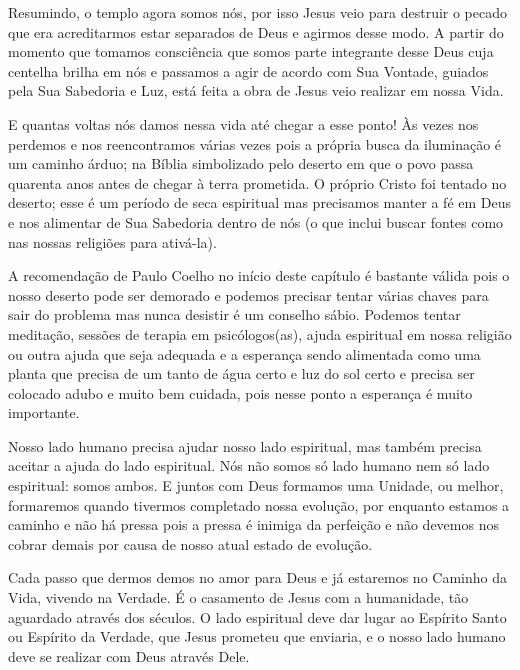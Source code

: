 \emdash{}Resumindo, o templo agora somos nós, por isso Jesus veio para destruir o pecado que era acreditarmos estar separados de Deus e agirmos desse modo. A partir do momento que tomamos consciência que somos parte integrante desse Deus cuja centelha brilha em nós e passamos a agir de acordo com Sua Vontade, guiados pela Sua Sabedoria e Luz, está feita a obra de Jesus veio realizar em nossa Vida. 

\emdash{}E quantas voltas nós damos nessa vida até chegar a esse ponto! Às vezes nos perdemos e nos reencontramos várias vezes pois a própria busca da iluminação é um caminho árduo; na Bíblia simbolizado pelo deserto em que o povo passa quarenta anos antes de chegar à terra prometida. O próprio Cristo foi tentado no deserto; esse é um período de seca espiritual mas precisamos manter a fé em Deus e nos alimentar de Sua Sabedoria dentro de nós (o que inclui buscar fontes como nas nossas religiões para ativá-la).

\emdash{}A recomendação de Paulo Coelho no início deste capítulo é bastante válida pois o nosso deserto pode ser demorado e podemos precisar tentar várias chaves para sair do problema mas nunca desistir é um conselho sábio. Podemos tentar meditação, sessões de terapia em psicólogos(as), ajuda espiritual em nossa religião ou outra ajuda que seja adequada e a esperança sendo alimentada como uma planta que precisa de um tanto de água certo e luz do sol certo e precisa ser colocado adubo e muito bem cuidada, pois nesse ponto a esperança é muito importante.

\emdash{}Nosso lado humano precisa ajudar nosso lado espiritual, mas também precisa aceitar a ajuda do lado espiritual. Nós não somos só lado humano nem só lado espiritual: somos ambos. E juntos com Deus formamos uma Unidade, ou melhor, formaremos quando tivermos completado nossa evolução, por enquanto estamos a caminho e não há pressa pois a pressa é inimiga da perfeição e não devemos nos cobrar demais por causa de nosso atual estado de evolução.

\emdash{}Cada passo que dermos demos no amor para Deus e já estaremos no Caminho da Vida, vivendo na Verdade. É o casamento de Jesus com a humanidade, tão aguardado através dos séculos. O lado espiritual deve dar lugar ao Espírito Santo ou Espírito da Verdade, que Jesus prometeu que enviaria, e o nosso lado humano deve se realizar com Deus através Dele.